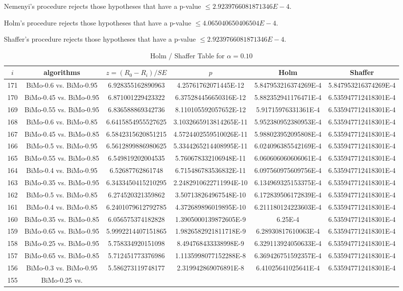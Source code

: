 \documentclass[a4paper,10pt]{article}
\begin{document}
\begin{landscape}
\begin{table}[!htp]
\begin{tabular}{cccccc}
\end{tabular}
\end{table}
Nemenyi's procedure rejects those hypotheses that have a p-value $\le2.9239766081871346E-4$.


Holm's procedure rejects those hypotheses that have a p-value $\le4.065040650406504E-4$.


Shaffer's procedure rejects those hypotheses that have a p-value $\le2.9239766081871346E-4$.


\begin{table}[!htp]
\centering\tiny
\caption{Holm / Shaffer Table for $\alpha=0.10$}
\begin{tabular}{cccccc}
$i$&algorithms&$z=(R_0 - R_i)/SE$&$p$&Holm&Shaffer\\
\hline
171&BiMo-0.6 vs. BiMo-0.95&6.928355162890963&4.25761762071445E-12&5.847953216374269E-4&5.847953216374269E-4\\170&BiMo-0.45 vs. BiMo-0.95&6.871001229423322&6.375284456650316E-12&5.882352941176471E-4&6.535947712418301E-4\\169&BiMo-0.55 vs. BiMo-0.95&6.836588869342736&8.110105592057652E-12&5.91715976331361E-4&6.535947712418301E-4\\168&BiMo-0.6 vs. BiMo-0.85&6.6415854955527625&3.1032665913814265E-11&5.952380952380953E-4&6.535947712418301E-4\\167&BiMo-0.45 vs. BiMo-0.85&6.5842315620851215&4.5724402559510026E-11&5.988023952095808E-4&6.535947712418301E-4\\166&BiMo-0.5 vs. BiMo-0.95&6.5612899886980625&5.3344265214408995E-11&6.024096385542169E-4&6.535947712418301E-4\\165&BiMo-0.55 vs. BiMo-0.85&6.549819202004535&5.760678332106948E-11&6.060606060606061E-4&6.535947712418301E-4\\164&BiMo-0.4 vs. BiMo-0.95&6.52687762861748&6.715486783536832E-11&6.097560975609756E-4&6.535947712418301E-4\\163&BiMo-0.35 vs. BiMo-0.95&6.3433450415210295&2.2482910622711994E-10&6.134969325153375E-4&6.535947712418301E-4\\162&BiMo-0.5 vs. BiMo-0.85&6.274520321359862&3.507138264967548E-10&6.172839506172839E-4&6.535947712418301E-4\\161&BiMo-0.4 vs. BiMo-0.85&6.2401079612792785&4.372689896019895E-10&6.211180124223603E-4&6.535947712418301E-4\\160&BiMo-0.35 vs. BiMo-0.85&6.056575374182828&1.3905000139872605E-9&6.25E-4&6.535947712418301E-4\\159&BiMo-0.65 vs. BiMo-0.95&5.9992214407151865&1.9826582921811718E-9&6.28930817610063E-4&6.535947712418301E-4\\158&BiMo-0.25 vs. BiMo-0.95&5.758334920151098&8.494768433338998E-9&6.329113924050633E-4&6.535947712418301E-4\\157&BiMo-0.65 vs. BiMo-0.85&5.712451773376986&1.1135998077152288E-8&6.369426751592357E-4&6.535947712418301E-4\\156&BiMo-0.3 vs. BiMo-0.95&5.586273119748177&2.319942869076891E-8&6.41025641025641E-4&6.535947712418301E-4\\155&BiMo-0.25 vs. 
\end{tabular}
\end{table}
\end{landscape}
\end{document}
